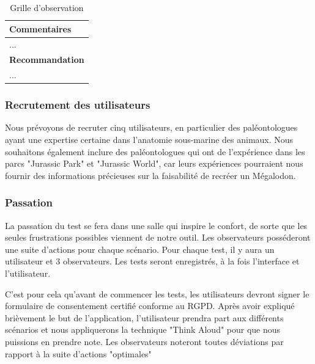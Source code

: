 \documentclass{article}
\begin{document}
\begin{table}[h]
\begin{tabular}{|p{6cm}|p{1.5cm}|p{1.5cm}|p{2.5cm}|}
		\multicolumn{4}{|p{14cm}|}{\textbf{Commentaires}}                                                                                              \\ \hline
		\multicolumn{4}{|p{14cm}|}{...}                                                                                                                \\ \hline
		\multicolumn{4}{|p{14cm}|}{\textbf{Recommandation}}                                                                                            \\ \hline
		\multicolumn{4}{|p{14cm}|}{...}                                                                                                                \\ \hline
	\end{tabular}
	\caption{\label{grille_observation} Grille d'observation}
\end{table}



\clearpage
\subsubsection{Recrutement des utilisateurs}
Nous prévoyons de recruter cinq utilisateurs, en particulier des paléontologues ayant une expertise certaine dans l'anatomie sous-marine des animaux. Nous souhaitons également inclure des paléontologues qui ont de l'expérience dans les parcs "Jurassic Park" et "Jurassic World", car leurs expériences pourraient nous fournir des informations précieuses sur la faisabilité de recréer un Mégalodon.

\subsubsection{Passation}
La passation du test se fera dans une salle qui inspire le confort, de sorte que les seules frustrations possibles viennent de notre outil. Les observateurs posséderont une suite d'actions pour chaque scénario. Pour chaque test, il y aura un utilisateur et 3 observateurs. Les tests seront enregistrés, à la fois l'interface et l'utilisateur.

C'est pour cela qu'avant de commencer les tests, les utilisateurs devront signer le formulaire de consentement certifié conforme au RGPD. Après avoir expliqué brièvement le but de l'application, l'utilisateur prendra part aux différents scénarios et nous appliquerons la technique "Think Aloud" pour que nous puissions en prendre note.
Les observateurs noteront toutes déviations par rapport à la suite d'actions "optimales"
\end{document}
